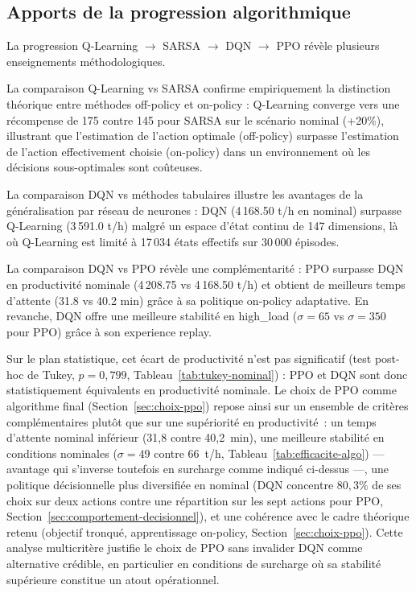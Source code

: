 \documentclass[11pt,a4paper]{report}
\begin{document}
\subsection{Apports de la progression algorithmique}

La progression Q-Learning $\to$ SARSA $\to$ DQN $\to$ PPO révèle plusieurs enseignements méthodologiques.

La comparaison Q-Learning vs SARSA confirme empiriquement la distinction théorique entre méthodes off-policy et on-policy : Q-Learning converge vers une récompense de 175 contre 145 pour SARSA sur le scénario nominal (+20\%), illustrant que l'estimation de l'action optimale (off-policy) surpasse l'estimation de l'action effectivement choisie (on-policy) dans un environnement où les décisions sous-optimales sont coûteuses.

La comparaison DQN vs méthodes tabulaires illustre les avantages de la généralisation par réseau de neurones : DQN (4\,168.50 t/h en nominal) surpasse Q-Learning (3\,591.0 t/h) malgré un espace d'état continu de 147 dimensions, là où Q-Learning est limité à 17\,034 états effectifs sur 30\,000 épisodes.

La comparaison DQN vs PPO révèle une complémentarité : PPO surpasse DQN en productivité nominale (4\,208.75 vs 4\,168.50 t/h) et obtient de meilleurs temps d'attente (31.8 vs 40.2 min) grâce à sa politique on-policy adaptative. En revanche, DQN offre une meilleure stabilité en high\_load ($\sigma = 65$ vs $\sigma = 350$ pour PPO) grâce à son experience replay.

Sur le plan statistique, cet écart de productivité n'est pas significatif (test post-hoc de Tukey, $p = 0{,}799$, Tableau~\ref{tab:tukey-nominal}) : PPO et DQN sont donc statistiquement équivalents en productivité nominale. Le choix de PPO comme algorithme final (Section~\ref{sec:choix-ppo}) repose ainsi sur un ensemble de critères complémentaires plutôt que sur une supériorité en productivité~: un temps d'attente nominal inférieur (31,8 contre 40,2~min), une meilleure stabilité en conditions nominales ($\sigma = 49$ contre $66$~t/h, Tableau~\ref{tab:efficacite-algo}) --- avantage qui s'inverse toutefois en surcharge comme indiqué ci-dessus ---, une politique décisionnelle plus diversifiée en nominal (DQN concentre $80{,}3\%$ de ses choix sur deux actions contre une répartition sur les sept actions pour PPO, Section~\ref{sec:comportement-decisionnel}), et une cohérence avec le cadre théorique retenu (objectif tronqué, apprentissage on-policy, Section~\ref{sec:choix-ppo}). Cette analyse multicritère justifie le choix de PPO sans invalider DQN comme alternative crédible, en particulier en conditions de surcharge où sa stabilité supérieure constitue un atout opérationnel.
\end{document}
